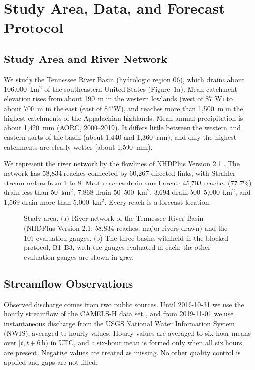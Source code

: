 \section{Study Area, Data, and Forecast Protocol}
\label{sec:data}

\subsection{Study Area and River Network}
\label{sec:study}
We study the Tennessee River Basin (hydrologic region 06), which drains about 106,000~km$^2$ of the southeastern United States (Figure~\ref{fig:area}a). Mean catchment elevation rises from about 190~m in the western lowlands (west of 87$^\circ$W) to about 700~m in the east (east of 84$^\circ$W), and reaches more than 1,500~m in the highest catchments of the Appalachian highlands. Mean annual precipitation is about 1,420~mm (AORC, 2000--2019). It differs little between the western and eastern parts of the basin (about 1,440 and 1,360~mm), and only the highest catchments are clearly wetter (about 1,590~mm).

We represent the river network by the flowlines of NHDPlus Version 2.1 . The network has 58,834 reaches connected by 60,267 directed links, with Strahler stream orders from 1 to 8. Most reaches drain small areas: 45,703 reaches (77.7\%) drain less than 50~km$^2$, 7,868 drain 50--500~km$^2$, 3,694 drain 500--5,000~km$^2$, and 1,569 drain more than 5,000~km$^2$. Every reach is a forecast location.

\begin{figure}
\caption{Study area. (a) River network of the Tennessee River Basin (NHDPlus Version 2.1; 58,834 reaches, major rivers drawn) and the 101 evaluation gauges. (b) The three basins withheld in the blocked protocol, B1--B3, with the gauges evaluated in each; the other evaluation gauges are shown in gray.}
\label{fig:area}
\end{figure}

\subsection{Streamflow Observations}
\label{sec:gauges}
Observed discharge comes from two public sources. Until 2019-10-31 we use the hourly streamflow of the CAMELS-H data set , and from 2019-11-01 we use instantaneous discharge from the USGS National Water Information System (NWIS), averaged to hourly values. Hourly values are averaged to six-hour means over $[t, t+6\,\mathrm{h})$ in UTC, and a six-hour mean is formed only when all six hours are present. Negative values are treated as missing. No other quality control is applied and gaps are not filled.

